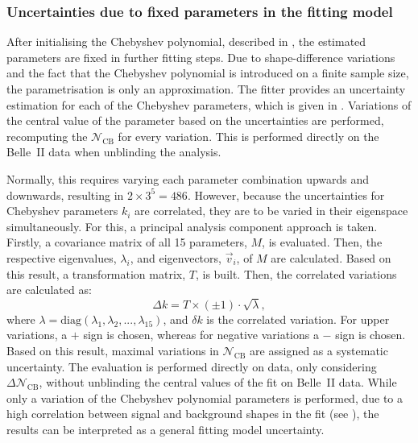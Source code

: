 \subsubsection{Uncertainties due to fixed parameters in the \texorpdfstring{\Mbc}{Mbc} fitting model}\label{sec:fitting_model_uncertainties}

After initialising the Chebyshev polynomial, described in , the estimated parameters are fixed in further fitting steps.
Due to shape-difference variations and the fact that the Chebyshev polynomial is introduced on a finite sample size, the parametrisation is only an approximation.
The \Mbc fitter provides an uncertainty estimation for each of the Chebyshev \PDF parameters, which is given in .
Variations of the central value of the parameter based on the uncertainties are performed, recomputing the $\mathcal{N}_{\mathrm{CB}}$ for every variation.
This is performed directly on the Belle~II data when unblinding the analysis.

Normally, this requires varying each parameter combination upwards and downwards, resulting in $2\times3^5=486$.
However, because the uncertainties for Chebyshev parameters $k_i$ are correlated, they are to be varied in their eigenspace simultaneously.
For this, a principal analysis component approach is taken.
Firstly, a covariance matrix of all 15 parameters, $M$, is evaluated.
Then, the respective eigenvalues, $\lambda_i$, and eigenvectors, $\vec{v}_i$, of $M$ are calculated.
Based on this result, a transformation matrix, $T$, is built.
Then, the correlated variations are calculated as:
\begin{equation}
    \Delta k = T \times (\pm1)\cdot \sqrt{\lambda},
\end{equation}
where $\lambda=\mathrm{diag}(\lambda_1, \lambda_2,...,\lambda_{15})$, and $\delta k$ is the correlated variation.
For upper variations, a $+$ sign is chosen, whereas for negative variations a $-$ sign is chosen.
Based on this result, maximal variations in $\mathcal{N}_{\mathrm{CB}}$ are assigned as a systematic uncertainty.
The evaluation is performed directly on data, only considering $\Delta\mathcal{N}_{\mathrm{CB}}$, without unblinding the central values of the \Mbc fit on Belle~II data.
While only a variation of the Chebyshev polynomial parameters is performed, 
due to a high correlation between signal and background \PDF shapes in the fit (see ),
the results can be interpreted as a general fitting model uncertainty.

